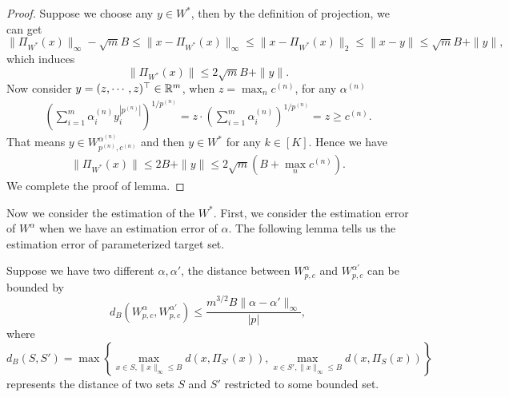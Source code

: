 \begin{proof}
    Suppose we choose any $y \in W^*$, then by the definition of projection, we can get $$\|\Pi_{W^*}(x)\|_\infty-\sqrt{m}B\le \|x - \Pi_{W^*}(x)\|_\infty \le \|x - \Pi_{W^*}(x)\|_2 \le \|x - y\| \le \sqrt{m}B + \|y\|,$$
    which induces $$\|\Pi_{W^*}(x)\| \le 2\sqrt{m}B + \|y\|.$$
    Now consider $y = (z, \cdots, z)^\top \in \mathbb{R}^m$, when $z= \max_n c^{(n)}$, for any $\alpha^{(n)}$
    \begin{align*}
        \left(\sum_{i=1}^m \alpha_i^{(n)} y_i^{|p^{(n)}|}\right)^{1/p^{(n)}} = z\cdot \left(\sum_{i=1}^m \alpha_i^{(n)}\right)^{1/p^{(n)}}= z \ge c^{(n)}.
    \end{align*}
    That means $y \in W^{\alpha^{(n)}}_{p^{(n)}, c^{(n)}}$ and then $y \in W^*$ for any $k \in [K].$ Hence we have 
    \begin{align*}
        \|\Pi_{W^*}(x)\| \le 2B + \|y\| \le 2\sqrt{m}(B+\max_n c^{(n)}).
    \end{align*}
    We complete the proof of lemma.
\end{proof}
Now we consider the estimation of the $W^*$. First, we consider the estimation error of $W^\alpha$ when we have an estimation error of $\alpha.$ The following lemma tells us the estimation error of parameterized target set.

 \begin{lemma}\label{lemma:estimation error of parameterized target set}
     Suppose we have two different $\alpha, \alpha'$, the distance between $W_{p,c}^{\alpha}$ and $W_{p,c}^{\alpha'}$ can be bounded by 
     \begin{equation*}
         d_B(W_{p,c}^{\alpha}, W_{p,c}^{\alpha'}) \le \frac{m^{3/2}B\|\alpha-\alpha'\|_\infty}{|p|},
     \end{equation*}
     where $$d_B(S,S') = \max\left\{\max_{x \in S, \|x\|_\infty \le B}d(x,\Pi_{S'}(x)), \max_{x \in S', \|x\|_\infty \le B}d(x,\Pi_{S}(x))\right\}$$ represents the distance of two sets $S$ and $S'$ restricted to some bounded set.
 \end{lemma}

